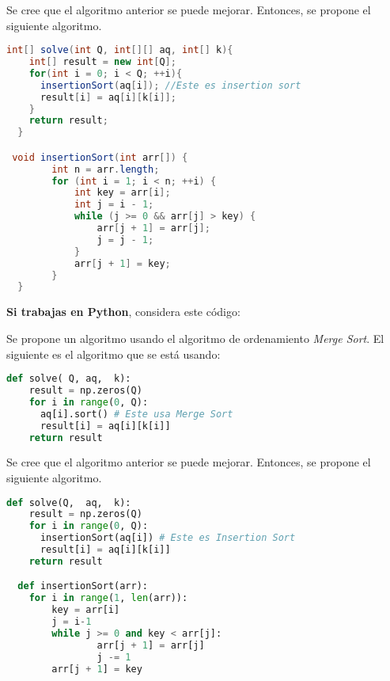 \documentclass[10 pt]{article}
\begin{document}
Se cree que el algoritmo anterior se puede mejorar. Entonces, se propone el siguiente algoritmo.
\begin{lstlisting}[language = Java]
 int[] solve(int Q, int[][] aq, int[] k){
    int[] result = new int[Q];
    for(int i = 0; i < Q; ++i){      
      insertionSort(aq[i]); //Este es insertion sort
      result[i] = aq[i][k[i]];
    }
    return result;
  }

 void insertionSort(int arr[]) {
        int n = arr.length;
        for (int i = 1; i < n; ++i) {
            int key = arr[i];
            int j = i - 1;
            while (j >= 0 && arr[j] > key) {
                arr[j + 1] = arr[j];
                j = j - 1;
            }
            arr[j + 1] = key;
        }
  }
\end{lstlisting}

\hspace{1cm}

\textbf{Si trabajas en Python}, considera este código:


 Se propone un algoritmo usando el algoritmo de ordenamiento \emph{Merge Sort}. El siguiente es el algoritmo que se está usando:
\begin{lstlisting}[language = Python]
  def solve( Q, aq,  k):
    result = np.zeros(Q)
    for i in range(0, Q):
      aq[i].sort() # Este usa Merge Sort
      result[i] = aq[i][k[i]]
    return result
\end{lstlisting}

\newpage
Se cree que el algoritmo anterior se puede mejorar. Entonces, se propone el siguiente algoritmo.

\begin{lstlisting}[language = Python]
  def solve(Q,  aq,  k):
    result = np.zeros(Q)
    for i in range(0, Q):
      insertionSort(aq[i]) # Este es Insertion Sort
      result[i] = aq[i][k[i]]
    return result

  def insertionSort(arr):
    for i in range(1, len(arr)):
        key = arr[i]
        j = i-1
        while j >= 0 and key < arr[j]:
                arr[j + 1] = arr[j]
                j -= 1
        arr[j + 1] = key
\end{lstlisting}
\end{document}
